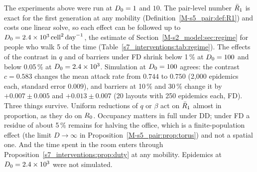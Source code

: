 The experiments above were run at $D_0=1$ and $10$. The pair-level number $\bar{R}_1$ is exact for the first
generation at any mobility (Definition~\ref{M-s5_pair:def:R1}) and costs one linear solve, so each effect can be
followed up to $D_0=2.4\times10^{3}\,\mathrm{cell}^2\,\mathrm{day}^{-1}$, the estimate of Section~\ref{M-s2_model:sec:regime} for people who
walk 5\pct{} of the time (Table~\ref{s7_interventions:tab:regime}). The effects
of the contrast in $q$ and of
barriers under FD shrink below 1\,\% at $D_0=100$ and below 0.05\,\% at $D_0=2.4\times10^{3}$. Simulation at
$D_0=100$ agrees: the contrast $c=0.583$ changes the mean attack rate from $0.744$ to $0.750$ (2,000 epidemics each,
standard error $0.009$), and barriers at 10\,\% and 30\,\% change it by $+0.007\pm0.005$ and $+0.013\pm0.007$
(20 layouts with 250 epidemics each, FD).
Three things survive. Uniform reductions of $q$ or $\beta$ act on $\bar{R}_1$ almost in proportion, as they do
on $R_0$. Occupancy matters in full under DD; under FD a residue of about 5\,\% remains for halving the office,
which is a finite-population effect (the limit $D\to\infty$ in Proposition~\ref{M-s5_pair:prop:torus}) and not a
spatial one. And the
time spent in the room enters through Proposition~\ref{s7_interventions:prop:duty} at any mobility. Epidemics
at $D_0=2.4\times10^{3}$ were not simulated.


